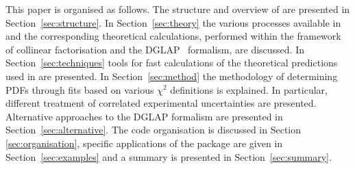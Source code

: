 This paper is organised as follows.
%
The structure and overview of \fitter are presented in Section~\ref{sec:structure}.
In Section~\ref{sec:theory} the various processes available in \fitter
and the corresponding theoretical calculations, performed within the framework of collinear factorisation and the DGLAP~\cite{Gribov:1972ri,Gribov:1972rt,Lipatov:1974qm,
Dokshitzer:1977sg,Altarelli:1977zs} formalism, are discussed. In
Section~\ref{sec:techniques} tools for fast calculations of the theoretical predictions used in \fitter are presented.
In Section~\ref{sec:method} the 
methodology of determining PDFs through fits based on various
 $\chi^2$ definitions is explained. In particular, different treatment of correlated experimental uncertainties are presented.
Alternative approaches to the DGLAP formalism are presented in Section~\ref{sec:alternative}.
%
The \fitter code organisation is discussed in Section \ref{sec:organisation}, specific applications 
of the package are given in Section~\ref{sec:examples} and a summary is presented in Section~\ref{sec:summary}.
%
